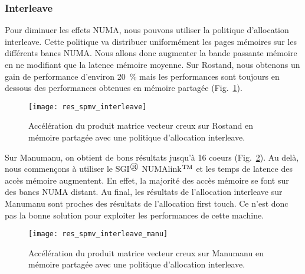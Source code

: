 \subsubsection{Interleave}
Pour diminuer les effets NUMA, nous pouvons utiliser la politique d'allocation interleave.
%
Cette politique va distribuer uniformément les pages mémoires sur les différents bancs NUMA.
%
Nous allons donc augmenter la bande passante mémoire en ne modifiant que la latence mémoire moyenne.
%
Sur Rostand, nous obtenons un gain de performance d'environ 20~\% mais les performances sont toujours en dessous des performances obtenues en mémoire partagée (Fig.~\ref{fig:res_spmv_interleave_rostand}).

\begin{figure}
  \centering
  \texttt{[image: res\_spmv\_interleave]}
  \caption{Accélération du produit matrice vecteur creux sur Rostand en mémoire partagée avec une politique d'allocation interleave.}
  \label{fig:res_spmv_interleave_rostand}
\end{figure}

Sur Manumanu, on obtient de bons résultats jusqu'à 16 coeurs (Fig.~\ref{fig:res_spmv_interleave_manumanu}).
%
Au delà, nous commençons à utiliser le SGI$^\registered$ NUMAlink$^{\rm TM}$\cite{numalink} et les temps de latence des accès mémoire augmentent.
%
En effet, la majorité des accès mémoire se font sur des bancs NUMA distant.
%
Au final, les résultats de l'allocation interleave sur Manumanu sont proches des résultats de l'allocation first touch.
%
Ce n'est donc pas la bonne solution pour exploiter les performances de cette machine.

\begin{figure}
  \centering
  \texttt{[image: res\_spmv\_interleave\_manu]}
  \caption{Accélération du produit matrice vecteur creux sur Manumanu en mémoire partagée avec une politique d'allocation interleave.}
  \label{fig:res_spmv_interleave_manumanu}
\end{figure}
